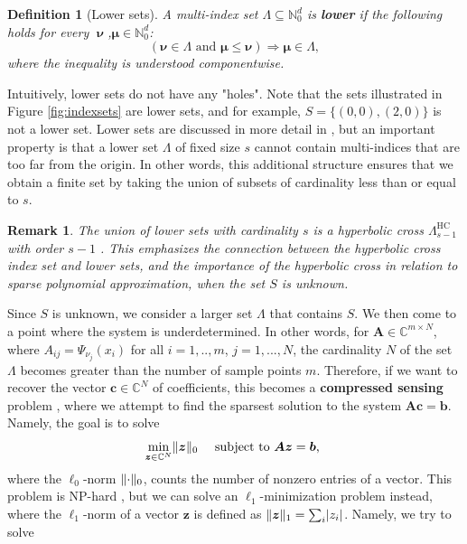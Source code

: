\documentclass[12pt, oneside]{report}   	%
\newcommand{\C}{\mathbb{C}}
\newcommand{\N}{\mathbb{N}}
\newtheorem{defn}{Definition}
\newtheorem{rmk}{Remark}
\DeclarePairedDelimiter{\abs}{\lvert}{\rvert}
\DeclarePairedDelimiter{\norm}{\lVert}{\rVert}        %
\DeclareMathOperator{\nuu}{\boldsymbol{\nu}}
\begin{document}
\begin{defn}[Lower sets]
A multi-index set $\Lambda\subseteq\N_0^d$ is \textbf{lower} if the following holds for every $\nuu$,$\boldsymbol{\mu}\in\N_0^d$:
$$
(\boldsymbol{\nu} \in \Lambda \text { and } \boldsymbol{\mu} \leq \boldsymbol{\nu}) \Longrightarrow \boldsymbol{\mu} \in \Lambda,
$$
where the inequality is understood componentwise.
\end{defn}
\smallskip
\noindent Intuitively, lower sets do not have any "holes". Note that the sets illustrated in Figure \ref{fig:indexsets} are lower sets, and for example, $S=\{(0,0), (2,0)\}$ is not a lower set. Lower sets are discussed in more detail in \cite{sparsepoly}, but an important property is that a lower set $\Lambda$ of fixed size $s$ cannot contain multi-indices that are too far from the origin. In other words, this additional structure ensures that we obtain a finite set by taking the union of subsets of cardinality less than or equal to $s$.
\begin{rmk}
\noindent The union of lower sets with cardinality $s$ is a hyperbolic cross $\Lambda_{s-1}^{\mathrm{HC}}$ with order $s-1$ \cite{sparsepoly}. This emphasizes the connection between the hyperbolic cross index set and lower sets, and the importance of the hyperbolic cross in relation to sparse polynomial approximation, when the set $S$ is unknown.
\end{rmk}
\noindent Since $S$ is unknown, we consider a larger set $\Lambda$ that contains $S$. We then come to a point where the system is underdetermined. In other words, for $\boldsymbol{A}\in\C^{m\times N}$, where $A_{ij}=\Psi_{\nu_j}(x_i)$ for all $i=1,..,m$, $j=1,...,N$, the cardinality $N$ of the set $\Lambda$ becomes greater than the number of sample points $m$. Therefore, if we want to recover the vector $\textbf{c}\in\C^N$ of coefficients, this becomes a \textbf{compressed sensing} problem \cite{donoho2006compressed}, where we attempt to find the sparsest solution to the system $\boldsymbol{A}\boldsymbol{c}=\boldsymbol{b}$. Namely, the goal is to solve
\begin{equation}
\label{eq:l0min}
\min_{\boldsymbol{z}\in\C^N} \norm{\boldsymbol{z}}_0 \quad \text { subject to } \boldsymbol{A z}=\boldsymbol{b} \text {, }
\end{equation}
where the $\ell_0$-norm $\norm{\cdot}_0$, counts the number of nonzero entries of a vector. This problem is NP-hard \cite{foucart2013invitation}, but we can solve an $\ell_1$-minimization problem instead, where the $\ell_1$-norm of a vector $\boldsymbol{z}$ is defined as $\norm{\boldsymbol{z}}_1=\sum_i \abs{z_i}$. Namely, we try to solve
\end{document}
